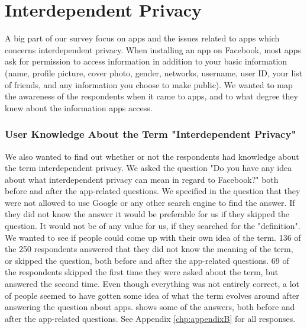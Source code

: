 \section{Interdependent Privacy}

A big part of our survey focus on apps and the issues related to apps which concerns interdependent privacy. When installing an app on Facebook, most apps ask for permission to access information in addition to your basic information (name, profile picture, cover photo, gender, networks, username, user ID, your list of friends, and any information you choose to make public). We wanted to map the awareness of the respondents when it came to apps, and to what degree they knew about the information apps access. 

\subsubsection{User Knowledge About the Term "Interdependent Privacy"}
We also wanted to find out whether or not the respondents had knowledge about the term interdependent privacy. We asked the question "Do you have any idea about what interdependent privacy can mean in regard to Facebook?" both before and after the app-related questions. We specified in the question that they were not allowed to use Google or any other search engine to find the answer. If they did not know the answer it would be preferable for us if they skipped the question. It would not be of any value for us, if they searched for the "definition". We wanted to see if people could come up with their own idea of the term. 136 of the 250 respondents answered that they did not know the meaning of the term, or skipped the question, both before and after the app-related questions. 69 of the respondents skipped the first time they were asked about the term, but answered the second time. Even though everything was not entirely correct, a lot of people seemed to have gotten some idea of what the term evolves around after answering the question about apps.  shows some of the answers, both before and after the app-related questions. See Appendix \ref{chp:appendixB} for all responses.   



